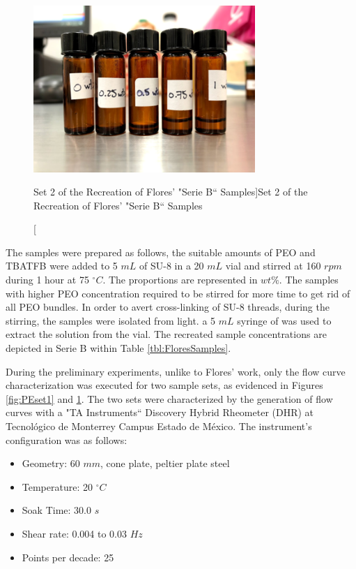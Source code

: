 \begin{figure}[th]
\centering
\includegraphics[width=0.75\textwidth]{./Figures/PEset2.png}
\decoRule
\caption[Set 2 of the Recreation of Flores' "Serie B`` Samples]{Set 2 of the Recreation of Flores' "Serie B`` Samples}
\label{fig:PEset2}
\end{figure}

The samples were prepared as follows, the suitable amounts of PEO and TBATFB were added to 5 $mL$ of SU-8 in a 20 $mL$ vial and stirred at 160 $r p m$ during 1 hour at 75 $^\circ C$. The proportions are represented in $w t \%$. The samples with higher PEO concentration required to be stirred for more time to get rid of all PEO bundles. In order to avert cross-linking of SU-8 threads, during the stirring, the samples were isolated from light. a 5 $mL$ syringe of was used to extract the solution from the vial. The recreated sample concentrations are depicted in Serie B within Table \ref{tbl:FloresSamples}.

During the preliminary experiments, unlike to Flores' work, only the flow curve characterization was executed for two sample sets, as evidenced in Figures \ref{fig:PEset1} and \ref{fig:PEset2}. The two sets were characterized by the generation of flow curves with a "TA Instruments`` Discovery Hybrid Rheometer (DHR) at Tecnológico de Monterrey Campus Estado de México. The instrument's configuration was as follows:

\begin{itemize}
	\item Geometry: 60 $mm$, cone plate, peltier plate steel
	\item Temperature: 20 $^\circ C$
	\item Soak Time: 30.0 $s$
	\item Shear rate: 0.004 to 0.03 $Hz$
	\item Points per decade: 25
\end{itemize}

